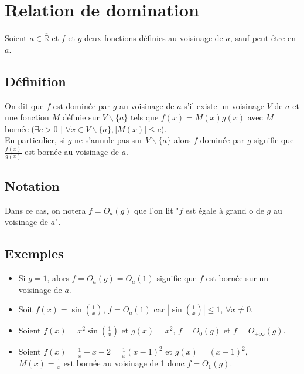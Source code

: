 \documentclass[a4paper,10pt]{book} %
\newcommand{\Rb}{\overline{\mathbb{R}}}
\begin{document}
\newpage

\section{Relation de domination}
Soient $a \in \Rb$ et $f$ et $g$ deux fonctions définies au voisinage de $a$, sauf peut-être en $a$.

\subsection{Définition}
On dit que $f$ est dominée par $g$ au voisinage de $a$ s'il existe un voisinage $V$ de $a$ et une fonction $M$ définie sur $V\backslash\{a\}$ tels que $f(x)=M(x)g(x)$ avec $M$ bornée ($\exists c>0$ | $\forall x\in V\backslash \{a\}, |M(x)|\leq c$).\\

En particulier, si $g$ ne s'annule pas sur $V\backslash \{a\}$ alors $f$ dominée par $g$ signifie que $\frac{f(x)}{g(x)}$ est bornée au voisinage de $a$.

\subsection{Notation}
Dans ce cas, on notera $f=O_a(g)$ que l'on lit "$f$ est égale à grand o de $g$ au voisinage de $a$".

\subsection{Exemples}
\begin{itemize}[label=$\bullet$]
\item Si $g=1$, alors $f=O_a(g)=O_a(1)$ signifie que $f$ est bornée sur un voisinage de $a$.\\

\item Soit $f(x)=\sin(\frac{1}{x})$, $f=O_a(1)$ car $|\sin(\frac{1}{x})|\leq 1$, $\forall x\neq 0$.\\

\item Soient $f(x)=x^2 \sin(\frac{1}{x})$ et $g(x)=x^2$, $f=O_0(g)$ et $f=O_{+\infty}(g)$.\\

\item Soient $f(x)=\frac{1}{x}+x-2=\frac{1}{x}(x-1)^2$ et $g(x)=(x-1)^2$,\\
$M(x)=\frac{1}{x}$ est bornée au voisinage de 1 donc $f=O_1(g)$.

\end{itemize}
\end{document}
